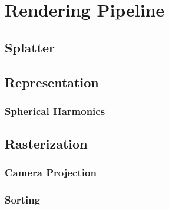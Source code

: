 

\section{Rendering Pipeline}
\subsection{Splatter}

\subsection{Representation}
\subsubsection{Spherical Harmonics}


\subsection{Rasterization}
\subsubsection{Camera Projection}
\subsubsection{Sorting}
